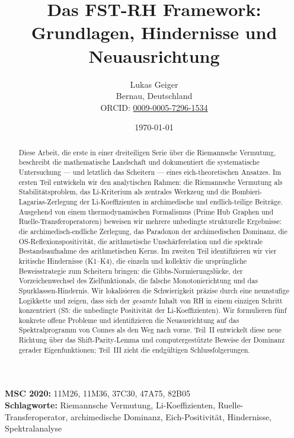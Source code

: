 \documentclass[12pt,a4paper]{article}
\title{Das FST-RH Framework:\\
Grundlagen, Hindernisse und Neuausrichtung}
\author{Lukas Geiger\\
\small Bernau, Deutschland\\
\small ORCID: \href{https://orcid.org/0009-0005-7296-1534}{0009-0005-7296-1534}}
\date{\today}
\theoremstyle{definition}
\theoremstyle{remark}
\begin{document}
\maketitle

\begin{abstract}
Diese Arbeit, die erste in einer dreiteiligen Serie über die Riemannsche Vermutung, beschreibt die mathematische Landschaft und dokumentiert die systematische Untersuchung --- und letztlich das Scheitern --- eines eich-theoretischen Ansatzes. Im ersten Teil entwickeln wir den analytischen Rahmen: die Riemannsche Vermutung als Stabilitätsproblem, das Li-Kriterium als zentrales Werkzeug und die Bombieri-Lagarias-Zerlegung der Li-Koeffizienten in archimedische und endlich-teilige Beiträge. Ausgehend von einem thermodynamischen Formalismus (Prime Hub Graphen und Ruelle-Transferoperatoren) beweisen wir mehrere unbedingte strukturelle Ergebnisse: die archimedisch-endliche Zerlegung, das Paradoxon der archimedischen Dominanz, die OS-Reflexionspositivität, die arithmetische Unschärferelation und die spektrale Bestandsaufnahme des arithmetischen Kerns. Im zweiten Teil identifizieren wir vier kritische Hindernisse (K1--K4), die einzeln und kollektiv die ursprüngliche Beweisstrategie zum Scheitern bringen: die Gibbs-Normierungslücke, der Vorzeichenwechsel des Zielfunktionals, die falsche Monotonierichtung und das Spurklassen-Hindernis. Wir lokalisieren die Schwierigkeit präzise durch eine neunstufige Logikkette und zeigen, dass sich der \emph{gesamte} Inhalt von RH in einem einzigen Schritt konzentriert (S5: die unbedingte Positivität der Li-Koeffizienten). Wir formulieren fünf konkrete offene Probleme und identifizieren die Neuausrichtung auf das Spektralprogramm von Connes als den Weg nach vorne. Teil~II entwickelt diese neue Richtung über das Shift-Parity-Lemma und computergestützte Beweise der Dominanz gerader Eigenfunktionen; Teil~III zieht die endgültigen Schlussfolgerungen.
\end{abstract}

\noindent\textbf{MSC 2020:} 11M26, 11M36, 37C30, 47A75, 82B05\\
\textbf{Schlagworte:} Riemannsche Vermutung, Li-Koeffizienten, Ruelle-Transferoperator, archimedische Dominanz, Eich-Positivität, Hindernisse, Spektralanalyse

\tableofcontents


\end{document}
